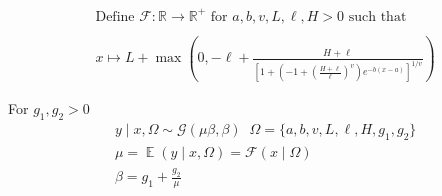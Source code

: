 \documentclass[a4paper,12pt]{article}
\DeclareMathOperator{\E}{\mathbb{E}}
\begin{document}
    \begin{align*}
        &\text{Define } \mathcal{F}: \mathbb{R} \to \mathbb{R}^{+} \text{ for } a, b, v, L, \ell, H > 0 \text{ such that } \\\\
        &x \mapsto L + \max\left(0, -\ell + \frac{H + \ell}{\left[1 + \left(-1 + \left(\frac{H + \ell}{\ell}\right)^{v}\right)e^{-b(x-a)}\right]^{1/v}} \right) \tag{4.2.1}
    \end{align*}


For $g_1, g_2 > 0$
    \begin{align*}
    &y \mid x, \Omega \sim \mathcal{G}\left(\mu\beta, \beta\right) \;\; \Omega = \{ a, b, v, L, \ell, H, g_1, g_2\} \tag{4.2.2} \\
    &\mu = \E\left(y \mid x, \Omega\right) = \mathcal{F}\left(x \mid \Omega\right) \tag{4.2.3}\\
    &\beta = g_1 + \frac{g_2}{\mu} \tag{4.2.4}\\
    \end{align*}
\end{document}
